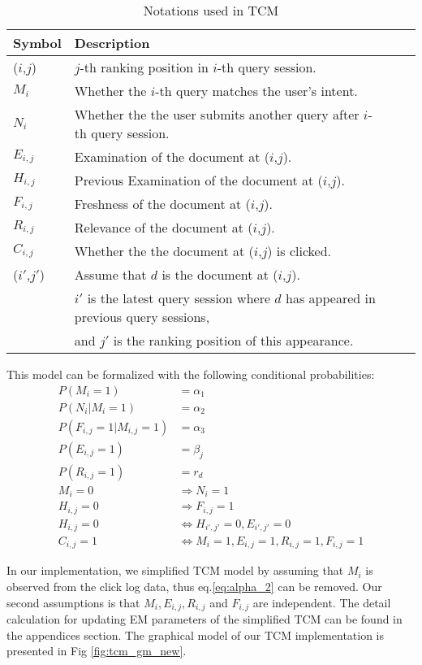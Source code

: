 \begin{table}[ht]
	\centering
	\begin{tabular}{l|lll|}
		\hline
		Symbol & Description \\
		\hline
		(\(i\),\(j\)) 	& \(j\)-th ranking position in \(i\)-th query session.\\
		$M_i$			& Whether the \(i\)-th query matches the user's intent.\\
		$N_i$ 			& Whether the the user submits another query after \(i\)-th query session.\\		
		$E_{i,j}$ 		& Examination of the document at (\(i\),\(j\)).\\
		$H_{i,j}$ 		& Previous Examination of the document at (\(i\),\(j\)).\\
		$F_{i,j}$ 		& Freshness of the document at (\(i\),\(j\)).\\
		$R_{i,j}$ 		& Relevance of the document at (\(i\),\(j\)).\\
		$C_{i,j}$ 		& Whether the the document at (\(i\),\(j\)) is clicked.\\
		(\(i'\),\(j'\)) & Assume that \(d\) is the document at (\(i\),\(j\)).\\
		&\(i'\) is the latest query session where \(d\) has appeared in previous query sessions,\\ &and \(j'\) is the ranking position of this appearance.\\
		\hline
	\end{tabular}
	\caption{Notations used in TCM}
	\label{table:tcm_notations}
\end{table}

This model can be formalized with the following conditional probabilities:
\begin{align}
	P(M_i=1) &= \alpha_1 \\
	\label{eq:alpha_2}
	P(N_i|M_i=1) &= \alpha_2 \\
	P(F_{i,j}=1|M_{i,j}=1) &= \alpha_3 \\
	P(E_{i,j}=1) &= \beta_j \\
	P(R_{i,j}=1) &= r_d \\
	M_i = 0 &\Rightarrow N_i = 1\\
	H_{i,j} = 0 &\Rightarrow F_{i,j} = 1\\
	H_{i,j} = 0 &\Leftrightarrow H_{i',j'} = 0, E_{i',j'} = 0\\
	C_{i,j} = 1 &\Leftrightarrow M_i = 1, E_{i,j} = 1, R_{i,j} = 1, F_{i,j} = 1
\end{align}

In our implementation, we simplified TCM model by assuming that $M_i$ is observed from the click log data, thus eq.\ref{eq:alpha_2} can be removed.
Our second assumptions is that $M_i, E_{i,j},R_{i,j}$ and $F_{i,j}$ are independent.
The detail calculation for updating EM parameters of the simplified TCM can be found in the appendices section.
The graphical model of our TCM implementation is presented in Fig \ref{fig:tcm_gm_new}.

